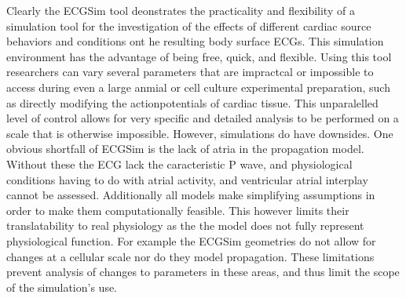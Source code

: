 \documentclass[12pt]{article}
\begin{document}
Clearly the ECGSim tool deonstrates the practicality and flexibility of a simulation tool for the investigation of the effects of different cardiac source behaviors and conditions ont he resulting body surface ECGs. This simulation environment has the advantage of being free, quick, and flexible. Using this tool researchers can vary several parameters that are impractcal or impossible to access during even a large anmial or cell culture experimental preparation, such as directly modifying the actionpotentials of cardiac tissue. This unparalelled level of control allows for very specific and detailed analysis to be performed on a scale that is otherwise impossible. However, simulations do have downsides. One obvious shortfall of ECGSim is the lack of atria in the propagation model. Without these the ECG lack the caracteristic P wave, and physiological conditions having to do with atrial activity, and ventricular atrial interplay cannot be assessed.  Additionally all models make simplifying assumptions in order to make them computationally feasible. This however limits their translatability to real physiology as the the model does not fully represent physiological function. For example the ECGSim geometries do not allow for changes at a cellular scale nor do they model propagation. These limitations prevent analysis of changes to parameters in these areas, and thus limit the scope of the simulation's use. 


%
%
\end{document}
